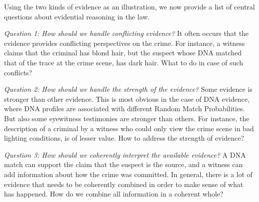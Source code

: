 \documentclass[10pt]{article}
\begin{document}
Using the two kinds of evidence as an illustration, we now provide 
a list of central questions about evidential reasoning in the law. 

\textit{Question 1:	How should we handle conflicting evidence?}
It often occurs that the evidence provides conflicting perspectives on the crime. For instance, a witness claims that the criminal has blond hair, 
but the suspect whose DNA matched that of the trace at the crime scene, has dark hair. What to do in case of such conflicts? 

\textit{Question 2:	How should we handle the strength of the evidence?}
Some evidence is stronger than other evidence. This is most obvious in the case of DNA evidence, where DNA profiles are associated with different Random Match Probabilities. But also some eyewitness testimonies are stronger than others. For instance, the description of a criminal by a witness who could only view the crime scene in bad lighting conditions, is of lesser value. How to address the strength of evidence?

\textit{Question 3:	How should we coherently interpret the available evidence?}
A DNA match can support the claim that the suspect is the source, and a witness can add information about how the crime was committed. In general, there is a lot of evidence that needs to be coherently combined in order to make sense of what has happened. How do we combine all information in a coherent whole?

\end{document}
